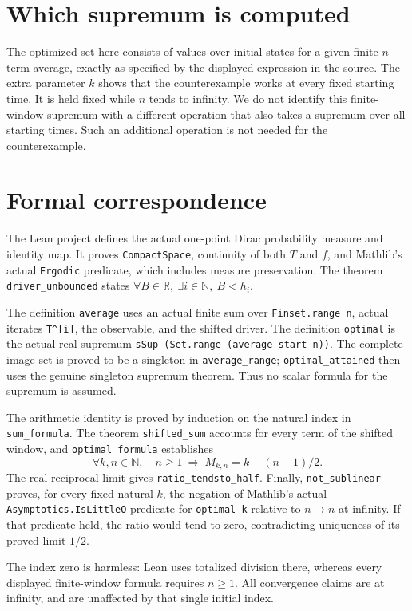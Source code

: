 \documentclass[11pt]{article}
\begin{document}
\newpage
\section*{Which supremum is computed}
The optimized set here consists of values over initial states for a given
finite $n$-term average, exactly as specified by the displayed expression in
the source. The extra parameter $k$ shows that the counterexample works at
every fixed starting time. It is held fixed while $n$ tends to infinity.
We do not identify this finite-window supremum with a different operation
that also takes a supremum over all starting times. Such an additional
operation is not needed for the counterexample.

\section*{Formal correspondence}
The Lean project defines the actual one-point Dirac probability measure and
identity map. It proves \texttt{CompactSpace}, continuity of both $T$ and
$f$, and Mathlib's actual \texttt{Ergodic} predicate, which includes measure
preservation. The theorem \texttt{driver\_unbounded} states
$\forall B\in\mathbb R,\ \exists i\in\mathbb N,\ B<h_i$.

The definition \texttt{average} uses an actual finite sum over
\texttt{Finset.range n}, actual iterates \texttt{T\^{}[i]}, the observable,
and the shifted driver. The definition \texttt{optimal} is the actual real
supremum \texttt{sSup (Set.range (average start n))}. The complete image set
is proved to be a singleton in \texttt{average\_range};
\texttt{optimal\_attained} then uses the genuine singleton supremum theorem.
Thus no scalar formula for the supremum is assumed.

The arithmetic identity is proved by induction on the natural index in
\texttt{sum\_formula}. The theorem \texttt{shifted\_sum} accounts for every
term of the shifted window, and \texttt{optimal\_formula} establishes
\[
 \forall k,n\in\mathbb N,\quad n\geq1\ \Longrightarrow\
 M_{k,n}=k+(n-1)/2.
\]
The real reciprocal limit gives \texttt{ratio\_tendsto\_half}.
Finally, \texttt{not\_sublinear} proves, for every fixed natural $k$, the
negation of Mathlib's actual \texttt{Asymptotics.IsLittleO} predicate for
\texttt{optimal k} relative to $n\mapsto n$ at infinity. If that predicate
held, the ratio would tend to zero, contradicting uniqueness of its proved
limit $1/2$.

The index zero is harmless: Lean uses totalized division there, whereas
every displayed finite-window formula requires $n\geq1$. All convergence
claims are at infinity, and are unaffected by that single initial index.
\end{document}

